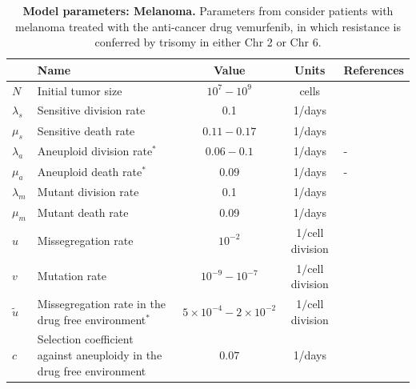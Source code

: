\documentclass[12pt]{extarticle}
\begin{document}

\nolinenumbers
%



\clearpage

\newpage
\begin{table}
\begin{center}
  \begin{tabular}{| l |p{5cm}| c | c | p{3cm} |}
    \hline
     & Name & Value & Units & References \\ \hline
    $N$ & Initial tumor size & $10^7-10^9$ & cells  & \citet{del2009does} \\ \hline
    $\lambda_s$ & Sensitive division rate& 0.1 & 1/days  & \citet{bozic2013evolutionary,rew2000cell} \\ \hline
    $\mu_s$ & Sensitive death rate& $0.11-0.17$ & 1/days  & \citet{bozic2013evolutionary} \\ \hline
    $\lambda_a$  & Aneuploid division rate$^\ast$ & $0.06-0.1$ & 1/days  & - \\ \hline
    $\mu_a$ & Aneuploid death rate$^\ast$ & $0.09$ & 1/days  & - \\ \hline
    $\lambda_m$ & Mutant division rate& 0.1 & 1/days  & \citet{bozic2013evolutionary,rew2000cell} \\ \hline
    $\mu_m$ & Mutant death rate& 0.09 & 1/days  & \citet{bozic2013evolutionary,carlson2003tumor} \\ \hline
    $u$ & Missegregation rate& $10^{-2}$ & 1$\slash$cell division  & \citet{lee2016effects} \\ \hline
    $v$ & Mutation rate& $10^{-9}-10^{-7}$ &  1$\slash$cell division  & \citet{bozic2013evolutionary,loeb2001mutator} \\  \hline
    $\tilde{u}$ & Missegregation rate in the drug free environment$^\ast$& $5\times10^{-4}-2\times10^{-2}$ & 1$\slash$cell division  & \citet{shi2005chromosome,thompson2008examining} \\ \hline
    $c$ & Selection coefficient against aneuploidy in the drug free environment& $0.07$ &  1/days   & \citet{lukow2021chromosomal} \\ \hline
  \end{tabular}
\caption{\textbf{Model parameters: Melanoma.} 
Parameters from \citet{bozic2013evolutionary} consider patients with melanoma treated with the anti-cancer drug vemurfenib, in which resistance is conferred by trisomy in either Chr 2 or Chr 6.
}
\end{center}
\end{table}
\end{document}
